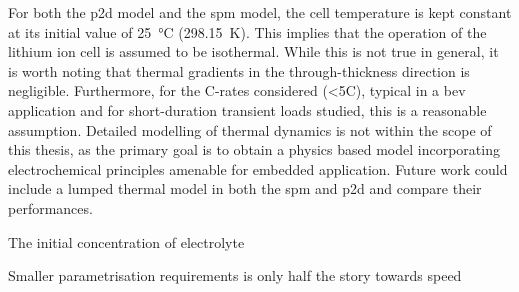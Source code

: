 For  both the  \gls{p2d} model  and the  \gls{spm} model,  the cell  temperature
is   kept   constant   at   its   initial   value   of   \SI{25}{\degreeCelsius}
(\SI{298.15}{\kelvin}). This implies that the  operation of the lithium ion cell
is assumed  to be isothermal.  While this  is not true  in general, it  is worth
noting that thermal gradients in  the through-thickness direction is negligible.
 Furthermore, for  the C-rates considered (<5C), typical
in a \gls{bev} application and  for short-duration transient loads studied, this
is a reasonable assumption. Detailed modelling of thermal dynamics is not within
the scope of this thesis, as the primary goal is to obtain a physics based model
incorporating  electrochemical  principles  amenable for  embedded  application.
Future work could include \eg{} a lumped thermal model in both the \gls{spm} and
\gls{p2d} and compare their performances.

The initial concentration of electrolyte

Smaller parametrisation requirements  is only half the story  towards speed

